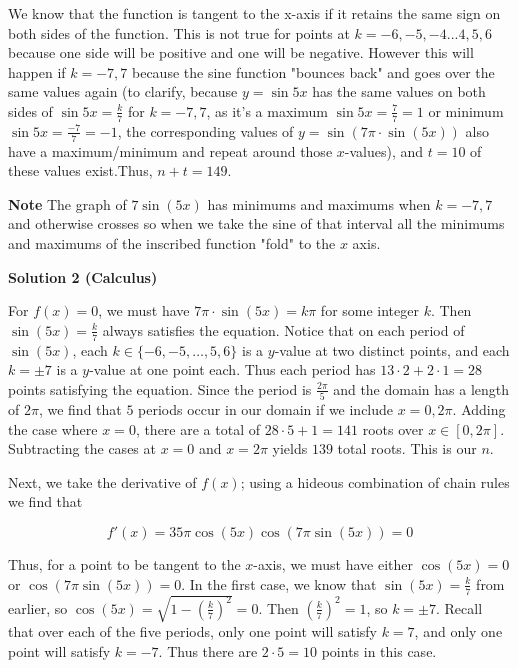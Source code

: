 \begin{enumerate}
 We know that the function is tangent to the x-axis if it retains the same sign on both sides of the function. This is not true for points at $k=-6,-5,-4...4,5,6$ because one side will be positive and one will be negative. However this will happen if $k=-7,7$ because the sine function "bounces back" and goes over the same values again (to clarify, because $y=\sin{5x}$ has the same values on both sides of $\sin{5x}=\frac{k}{7}$ for $k=-7,7$, as it's a maximum $\sin{5x}=\frac{7}{7}=1$ or minimum $\sin{5x}=\frac{-7}{7}=-1$, the corresponding values of $y=\sin(7\pi\cdot\sin(5x))$ also have a maximum/minimum and repeat around those $x$-values), and $t=10$ of these values exist.Thus, $n+t=\boxed{149}$.

 \textbf{Note} The graph of $7\sin(5x)$ has minimums and maximums when $k = -7,7$ and otherwise crosses so when we take the sine of that interval all the minimums and maximums of the inscribed function "fold" to the $x$ axis.

 



\textbf{Solution 2 (Calculus)}

For $f(x)=0$, we must have $7\pi\cdot\sin(5x)=k\pi$ for some integer $k$. Then $\sin(5x)=\frac{k}{7}$ always satisfies the equation. Notice that on each period of $\sin(5x)$, each $k\in\{-6,-5,\ldots,5,6\}$ is a $y$-value at two distinct points, and each $k=\pm7$ is a $y$-value at one point each. Thus each period has $13\cdot2+2\cdot1=28$ points satisfying the equation. Since the period is $\frac{2\pi}{5}$ and the domain has a length of $2\pi$, we find that $5$ periods occur in our domain if we include $x=0,2\pi$. Adding the case where $x=0$, there are a total of $28\cdot5+1=141$ roots over $x\in[0,2\pi]$. Subtracting the cases at $x=0$ and $x=2\pi$ yields $139$ total roots. This is our $n$.

 
Next, we take the derivative of $f(x)$; using a hideous combination of chain rules we find that

 
 \[f'(x)=35\pi\cos(5x)\cos(7\pi\sin(5x))=0\]

 Thus, for a point to be tangent to the $x$-axis, we must have either $\cos(5x)=0$ or $\cos(7\pi\sin(5x))=0$. In the first case, we know that $\sin(5x)=\frac{k}{7}$ from earlier, so $\cos(5x)=\sqrt{1-\left(\frac{k}{7}\right)^2}=0$. Then $\left(\frac{k}{7}\right)^2=1$, so $k=\pm7$. Recall that over each of the five periods, only one point will satisfy $k=7$, and only one point will satisfy $k=-7$. Thus there are $2\cdot5=10$ points in this case.


\end{enumerate}
